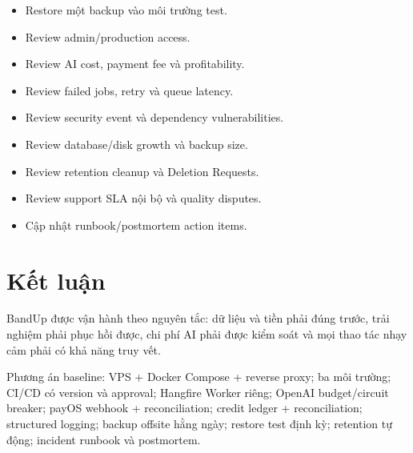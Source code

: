 \documentclass[11pt,a4paper]{article}
\begin{document}
\begin{itemize}
  \item[$\square$] Restore một backup vào môi trường test.
  \item[$\square$] Review admin/production access.
  \item[$\square$] Review AI cost, payment fee và profitability.
  \item[$\square$] Review failed jobs, retry và queue latency.
  \item[$\square$] Review security event và dependency vulnerabilities.
  \item[$\square$] Review database/disk growth và backup size.
  \item[$\square$] Review retention cleanup và Deletion Requests.
  \item[$\square$] Review support SLA nội bộ và quality disputes.
  \item[$\square$] Cập nhật runbook/postmortem action items.
\end{itemize}

\section{Kết luận}

BandUp được vận hành theo nguyên tắc: dữ liệu và tiền phải đúng trước, trải nghiệm phải phục hồi được, chi phí AI phải được kiểm soát và mọi thao tác nhạy cảm phải có khả năng truy vết.

\begin{successbox}
Phương án baseline: VPS + Docker Compose + reverse proxy; ba môi trường; CI/CD có version và approval; Hangfire Worker riêng; OpenAI budget/circuit breaker; payOS webhook + reconciliation; credit ledger + reconciliation; structured logging; backup offsite hằng ngày; restore test định kỳ; retention tự động; incident runbook và postmortem.
\end{successbox}
\end{document}
